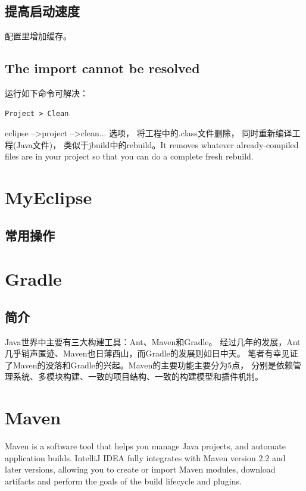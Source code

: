 \documentclass{book}
\begin{document}
\subsection{提高启动速度}

配置里增加缓存。

\subsection{The import cannot be resolved}

运行如下命令可解决：

\begin{lstlisting}
Project > Clean
\end{lstlisting}

eclipse -->project -->clean... 选项， 将工程中的.class文件删除，
同时重新编译工程(Java文件)，
类似于jbuild中的rebuild。It removes whatever already-compiled files 
are in your project so that you can do a complete fresh rebuild.


\section{MyEclipse}

\subsection{常用操作}

\section{Gradle}

\subsection{简介}

Java世界中主要有三大构建工具：Ant、Maven和Gradle。
经过几年的发展，Ant几乎销声匿迹、Maven也日薄西山，而Gradle的发展则如日中天。
笔者有幸见证了Maven的没落和Gradle的兴起。Maven的主要功能主要分为5点，
分别是依赖管理系统、多模块构建、一致的项目结构、一致的构建模型和插件机制。

\section{Maven}

Maven is a software tool that helps you manage Java projects, 
and automate application builds. IntelliJ IDEA fully integrates with Maven version 2.2 and later versions, 
allowing you to create or import Maven modules, download artifacts and perform the goals 
of the build lifecycle and plugins.
\end{document}
